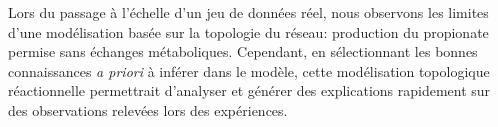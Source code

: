 \documentclass[../main.tex]{subfiles}
\begin{document}
Lors du passage à l'échelle d'un jeu de données réel, nous observons les limites d'une modélisation basée sur la topologie du réseau: production du propionate permise sans échanges métaboliques. Cependant, en sélectionnant les bonnes connaissances \textit{a priori} à inférer dans le modèle, cette modélisation topologique réactionnelle permettrait d'analyser et générer des explications rapidement sur des observations relevées lors des expériences.
\end{document}
